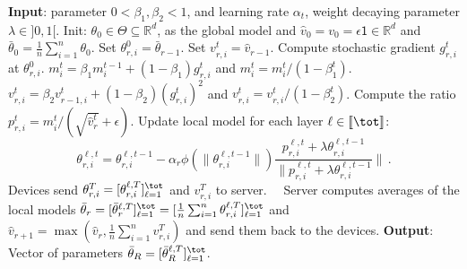 \documentclass[twoside]{article}
\begin{document}
\begin{algorithm}[t]
\caption{\algo\ } \label{alg:ldams}
\begin{algorithmic}[1]
\STATE \textbf{Input}: parameter $0< \beta_1, \beta_2 <1$, and learning rate $\alpha_t$, weight decaying parameter $\lambda \in ]0,1[$.
\STATE Init: $\theta_{0} \in \Theta \subseteq \mathbb R^d $, as the global model and $\hat v_0=v_{0} = \epsilon \mathsf{1} \in \mathbb R^{d}$ and $\bar{\theta}_0 =  \frac{1}{n} \sum_{i=1}^n \theta_0$.
\STATE Set $\theta_{r,i}^{0} = \bar{\theta}_{r-1}$.
\STATE Set $v^{t}_{r,i} = \hat{v}_{r-1}$.
\STATE Compute stochastic gradient $g^t_{r,i}$ at $\theta_{r,i}^{0}$.
\STATE $m^t_{i} = \beta_1 m^{t-1}_{i} + (1 - \beta_1) g^t_{r,i}$ and $m^{t}_{i}=m^{t}_{i} /\left(1-\beta_{1}^{t}\right)$. \label{line:new1}
\STATE $v^{t}_{r,i} = \beta_2 v^{t}_{r-1,i} + (1 - \beta_2) (g^t_{r,i})^2$ and $v^{t}_{r,i}=v^{t}_{r,i} /\left(1-\beta_{2}^{t}\right)$. \label{line:new2}
\STATE Compute the ratio  $p_{r,i}^t=m^{t}_{i}/(\sqrt{\hat v^{t}_{r}}+\epsilon)$. \label{line:scale}
\STATE Update local model for each layer $\ell \in \llbracket \tot \rrbracket$: \label{line:layer}
{\small
\begin{equation}\label{eq:upadtelayer}
    \theta_{r,i}^{\ell,t}=\theta_{r,i}^{\ell,t-1}-\alpha_{r} \phi(\|\theta_{r,i}^{\ell,t-1}\|)\frac{p_{r,i}^{\ell,t}+\lambda \theta_{r,i}^{\ell,t-1}}{ \|p_{r,i}^{\ell,t}+\lambda \theta_{r,i}^{\ell,t-1}}\|\, .
\end{equation}
}
\ENDFOR
\STATE Devices send $\theta_{r,i}^{T} = [\theta_{r,i}^{\ell,T}]_{\ell =1}^{\tot}$ and $v_{r,i}^T$ to server.
\ENDFOR
\STATE $\quad$Server computes averages of the local models $\bar{\theta}_r = [\bar{\theta}_r^{\ell,T}]_{\ell =1}^{\tot} = [\frac{1}{n} \sum_{i=1}^n \theta_{r,i}^{\ell,T}]_{\ell =1}^{\tot}$ and $\hat{v}_{r+1} = \max( \hat{v}_{r},\frac{1}{n} \sum_{i=1}^n v^T_{r,i} )$ and send them back to the devices. \label{line:final}
\ENDFOR
\STATE \textbf{Output}: Vector of parameters $\bar{\theta}_R = [\bar{\theta}_R^{\ell,T}]_{\ell =1}^{\tot}$.
\end{algorithmic}
\end{algorithm}
\end{document}
